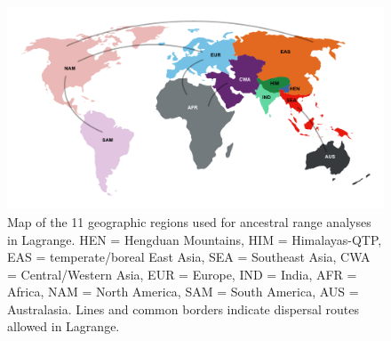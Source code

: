 \begin{figure}
\centering
\includegraphics[width=.99\linewidth]{figures/regions.pdf}
\caption{Map of the 11 geographic regions used for ancestral range
  analyses in Lagrange.  HEN = Hengduan Mountains, HIM =
  Himalayas-QTP, EAS = temperate/boreal East Asia, SEA = Southeast
  Asia, CWA = Central/Western Asia, EUR = Europe, IND = India, AFR =
  Africa, NAM = North America, SAM = South America, AUS =
  Australasia. Lines and common borders indicate dispersal routes
  allowed in Lagrange.}
\label{fig:regions}
\end{figure}

